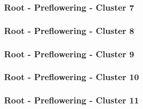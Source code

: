 

\clearpage

\subsubsection{Root - Preflowering - Cluster 7}

\vspace{1em}



\clearpage

\subsubsection{Root - Preflowering - Cluster 8}

\vspace{1em}



\clearpage

\subsubsection{Root - Preflowering - Cluster 9}

\vspace{1em}



\clearpage

\subsubsection{Root - Preflowering - Cluster 10}

\vspace{1em}



\clearpage

\subsubsection{Root - Preflowering - Cluster 11}

\vspace{1em}



